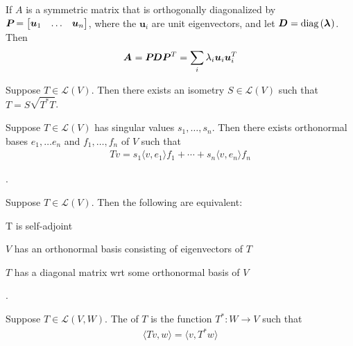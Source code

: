 \documentclass[11pt]{article}
\renewcommand\vec[2][]{\bm{#2}_{#1}}
\begin{document}
\begin{definition}
	If $A$ is a symmetric matrix that is orthogonally diagonalized by $\matr P = \begin{bmatrix} \vec[1]{u} & \ldots & \vec[n]{u} \end{bmatrix}$, where the $\vec[i]{u}$ are unit eigenvectors, and let $\matr D = \text{diag}\lr{\vec \lambda}$. Then 
	\begin{align}
		\matr A = \matr P \matr D \matr{P}^T = \sum_i \lambda_i \vec[i]{u} \vec[i]{u}^T
	\end{align}
\end{definition}

\begin{definition}
	Suppose $T \in \mathcal L(V)$. Then there exists an isometry $S \in \mathcal L(V)$ such that $T = S \sqrt{T^* T}$. 
\end{definition}

\begin{definition}
	Suppose $T \in \mathcal L(V)$ has singular values $s_1, \ldots, s_n$. Then there exists orthonormal bases $e_1, \ldots e_n$ and $f_1, \ldots, f_n$ of $V$ such that 
	\begin{align}
		Tv = s_1 \langle v, e_1 \rangle f_1 + \cdots + s_n \langle v, e_n \rangle f_n
	\end{align}
\end{definition}


.

\begin{definition}
	Suppose $T \in \mathcal L(V)$. Then the following are equivalent:
	\begin{compactitem}
		\item T is self-adjoint
		\item $V$ has an orthonormal basis consisting of eigenvectors of $T$
		\item $T$ has a diagonal matrix wrt some orthonormal basis of $V$
	\end{compactitem}
\end{definition}


. 

\begin{definition}[-1em][Adjoint]
	Suppose $T \in \mathcal L(V, W)$. The  of $T$ is the function $T^* : W \to V$ such that 
	\begin{align}
		\langle Tv, w \rangle = \langle v, T^* w \rangle 
	\end{align}
\end{definition}
\end{document}
